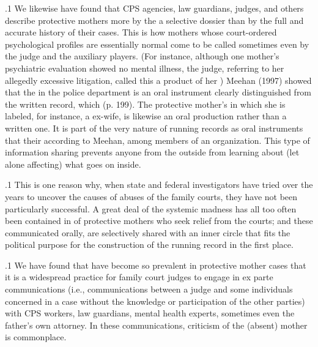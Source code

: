 \documentclass[11pt, twoside]{article}
\begin{document}
{\p.1{%
We likewise have found that CPS agencies, law guardians, judges, and
others describe protective mothers more by the \mdash{}a selective dossier \mdash{}than by the full and accurate history of their cases. This
is how mothers whose court-ordered psychological profiles are essentially normal come to be called  sometimes even  by
the judge and the auxiliary players. (For instance, although one mother’s
psychiatric evaluation showed no mental illness, the judge, referring to
her allegedly excessive litigation, called this a product of her )
Meehan (1997) showed that the  in the police department is an oral instrument clearly distinguished from the written
record, which  (p. 199). The protective mother’s  in which
she is labeled, for instance, a  ex-wife, is likewise an oral
production rather than a written one. It is part of the very nature of
running records as oral instruments that their 
according to Meehan,  among members of an organization. This type of information sharing prevents anyone from the outside from learning about
(let alone affecting) what goes on inside.
}%

\p.1{%
This is one reason why, when state and federal investigators have
tried over the years to uncover the causes of abuses of the family courts,
they have not been particularly successful. A great deal of the systemic
madness has all too often been contained in  of protective mothers who seek relief from the courts; and these  communicated orally, are selectively shared with an inner circle that fits the political purpose for the construction of the running
record in the first place.
}%

\p.1{%
We have found that  have become so prevalent in
protective mother cases that it is a widespread practice for family court
judges to engage in ex parte communications (i.e., communications between a judge and some individuals concerned in a case without the
knowledge or participation of the other parties) with CPS workers, law
guardians, mental health experts, sometimes even the father’s own attor\-ney. In these communications, criticism of the (absent) mother is
commonplace.
}%

}
\end{document}
